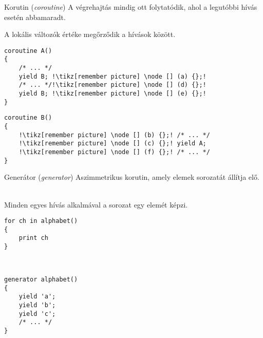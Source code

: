 \begin{frame}[fragile]{Korutin (\textit{coroutine})}
A végrehajtás mindig ott folytatódik, ahol a legutóbbi hívás esetén abbamaradt.

A lokális változók értéke megőrződik a hívások között.
\\
\begin{center}
\begin{minipage}{.40\textwidth}
\begin{lstlisting}[escapechar=!, keywords={coroutine, yield}]
coroutine A()
{
    /* ... */
    yield B; !\tikz[remember picture] \node [] (a) {};!
    /* ... */!\tikz[remember picture] \node [] (d) {};!
    yield B; !\tikz[remember picture] \node [] (e) {};!
}
\end{lstlisting}
\end{minipage}\hfill
\begin{minipage}{.50\textwidth}
\begin{lstlisting}[escapechar=!, showlines=true, keywords={coroutine, yield}]
coroutine B()
{
    !\tikz[remember picture] \node [] (b) {};! /* ... */
    !\tikz[remember picture] \node [] (c) {};! yield A; 
    !\tikz[remember picture] \node [] (f) {};! /* ... */
}

\end{lstlisting}
\end{minipage}
\end{center}
\par
\addtocounter{framenumber}{-1}
\end{frame}


\begin{frame}[fragile]{Generátor (\textit{generator})}
Aszimmetrikus korutin, amely elemek sorozatát állítja elő.

\hfill \\

Minden egyes hívás alkalmával a sorozat egy elemét képzi.

\begin{center}
\begin{minipage}{.40\textwidth}
\begin{lstlisting}[escapechar=!, showlines=true, keywords={for, in, print}]
for ch in alphabet()
{
    print ch
}



\end{lstlisting}
\end{minipage}\hfill
\begin{minipage}{.50\textwidth}
\begin{lstlisting}[escapechar=!, showlines=true, keywords={generator, yield}]
generator alphabet()
{
    yield 'a';
    yield 'b';
    yield 'c';
    /* ... */
}
\end{lstlisting}
\end{minipage}
\end{center}
\par
\end{frame}